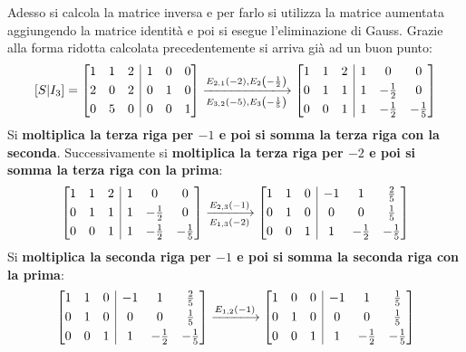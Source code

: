 \documentclass[a4paper]{article}
\makeatletter
\newenvironment{rowequmatbra}[1]{\left[\array{@{}#1@{}}}{\endarray\right]}
\makeatother
\begin{document}
	\noindent
	Adesso si calcola la matrice inversa e per farlo si utilizza la matrice aumentata aggiungendo la matrice identità e poi si esegue l'eliminazione di Gauss. Grazie alla forma ridotta calcolata precedentemente si arriva già ad un buon punto:
	\begin{equation*}
		\left[S | I_{3}\right] = \begin{rowequmatbra}{ccc|ccc}
			1 & 1 & 2 & 1 & 0 & 0 \\ [0.3em]
			2 & 0 & 2 & 0 & 1 & 0 \\ [0.3em]
			0 & 5 & 0 & 0 & 0 & 1
		\end{rowequmatbra}
		\xlongrightarrow[E_{3,2}\left(-5\right), E_{3}\left(-\frac{1}{5}\right)]{E_{2,1}\left(-2\right), E_{2}\left(-\frac{1}{2}\right)}
		\begin{rowequmatbra}{ccc|ccc}
			1 & 1 & 2 & 1 & 0 & 0 \\ [0.3em]
			0 & 1 & 1 & 1 & -\frac{1}{2} & 0 \\ [0.3em]
			0 & 0 & 1 & 1 & -\frac{1}{2} & -\frac{1}{5}
		\end{rowequmatbra}
	\end{equation*}
	Si \textbf{moltiplica la terza riga per $-1$ e poi si somma la terza riga con la seconda}. Successivamente si \textbf{moltiplica la terza riga per $-2$ e poi si somma la terza riga con la prima}:
	\begin{equation*}
		\begin{rowequmatbra}{ccc|ccc}
			1 & 1 & 2 & 1 & 0 & 0 \\ [0.3em]
			0 & 1 & 1 & 1 & -\frac{1}{2} & 0 \\ [0.3em]
			0 & 0 & 1 & 1 & -\frac{1}{2} & -\frac{1}{5}
		\end{rowequmatbra}
		\xlongrightarrow[E_{1,3}\left(-2\right)]{E_{2,3}\left(-1\right)}
		\begin{rowequmatbra}{ccc|ccc}
			1 & 1 & 0 & -1 & 1 & \frac{2}{5} \\ [0.3em]
			0 & 1 & 0 &  0 & 0 & \frac{1}{5} \\ [0.3em]
			0 & 0 & 1 &  1 & -\frac{1}{2} & -\frac{1}{5}
		\end{rowequmatbra}
	\end{equation*}
	Si \textbf{moltiplica la seconda riga per $-1$ e poi si somma la seconda riga con la prima}:
	\begin{equation*}
		\begin{rowequmatbra}{ccc|ccc}
			1 & 1 & 0 & -1 & 1 & \frac{2}{5} \\ [0.3em]
			0 & 1 & 0 &  0 & 0 & \frac{1}{5} \\ [0.3em]
			0 & 0 & 1 &  1 & -\frac{1}{2} & -\frac{1}{5}
		\end{rowequmatbra}
		\xlongrightarrow{E_{1,2}\left(-1\right)}
		\begin{rowequmatbra}{ccc|ccc}
			1 & 0 & 0 & -1 & 1 & \frac{1}{5} \\ [0.3em]
			0 & 1 & 0 &  0 & 0 & \frac{1}{5} \\ [0.3em]
			0 & 0 & 1 &  1 & -\frac{1}{2} & -\frac{1}{5}
		\end{rowequmatbra}
	\end{equation*}
\end{document}
